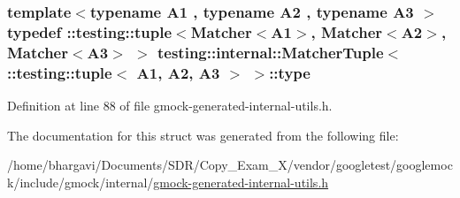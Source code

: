 \subsubsection[{\texorpdfstring{type}{type}}]{\setlength{\rightskip}{0pt plus 5cm}template$<$typename A1 , typename A2 , typename A3 $>$ typedef \+::testing\+::tuple$<${\bf Matcher}$<$A1$>$, {\bf Matcher}$<$A2$>$, {\bf Matcher}$<$A3$>$ $>$ {\bf testing\+::internal\+::\+Matcher\+Tuple}$<$ \+::testing\+::tuple$<$ A1, A2, A3 $>$ $>$\+::{\bf type}}\hypertarget{structtesting_1_1internal_1_1_matcher_tuple_3_01_1_1testing_1_1tuple_3_01_a1_00_01_a2_00_01_a3_01_4_01_4_a14ce558da46f2d3829b2dfacdab2c980}{}\label{structtesting_1_1internal_1_1_matcher_tuple_3_01_1_1testing_1_1tuple_3_01_a1_00_01_a2_00_01_a3_01_4_01_4_a14ce558da46f2d3829b2dfacdab2c980}


Definition at line 88 of file gmock-\/generated-\/internal-\/utils.\+h.



The documentation for this struct was generated from the following file\+:\begin{DoxyCompactItemize}
\item 
/home/bhargavi/\+Documents/\+S\+D\+R/\+Copy\+\_\+\+Exam\+\_\+X/vendor/googletest/googlemock/include/gmock/internal/\hyperlink{gmock-generated-internal-utils_8h}{gmock-\/generated-\/internal-\/utils.\+h}\end{DoxyCompactItemize}
